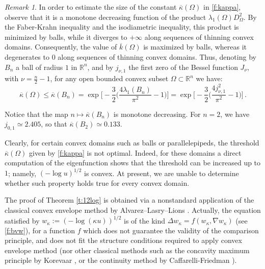 \documentclass[11pt]{amsart}
\theoremstyle{definition}
\theoremstyle{remark}
\newtheorem{remark}[theorem]{Remark}
\def\R{\mathbb{R}}
\def\Om{\Omega}
\def\k{\kappa}
\begin{document}
\smallskip 
 \begin{remark}\label{r:kappino} In order to estimate the size of  the constant $\overline \k (\Om)$ in \eqref{f:kappa},   observe that it is a monotone decreasing function of   the product $ \lambda _ 1 (\Om) D _\Om^2 $. 
 By the Faber-Krahn inequality and the isodiametric inequality,    this product is minimized by balls, 
while it diverges to $+ \infty$ along sequences of thinning convex domains.  Consequently, the value of $\overline k (\Om)$ is  maximized by balls, whereas it degenerates to $0$ along sequences of thinning convex domains. Thus, denoting by $B _n$ a ball of radius $1$  in  $\R^n$, and by  $j _{\nu, 1}$ the first zero of the Bessel function  $J _\nu$,  with $\nu = \frac{n}{2}- 1$,  for any 
open bounded convex subset   $\Om \subset \R ^n$   
 we have: 
\begin{equation}\label{f:kappamax}  \overline \k (\Om) \leq \overline \k ( B_n) =  \exp \Big [- \frac 3 2 \Big ( \frac{  4 \lambda _ 1 (B_n)   }{\pi ^ 2}  -1 \Big )  \Big ] =  \exp \Big [- \frac 3 2 \Big ( \frac{ 4j _{\nu, 1} ^ 2  }{\pi ^ 2}  -1 \Big )  \Big ]\,.
\end{equation}

Notice that the map  $n \mapsto \overline \k ( B_n)$ is monotone decreasing. For $n = 2$, 
we have $j _{0, 1}\simeq 2.405$, so that 
$\overline \k (B_2) \simeq 0.133$.  

Clearly,  for certain convex domains such as balls or parallelepipeds,  the threshold  $\overline \k (\Om)$  given by \eqref{f:kappa} is 
not optimal. Indeed, 
for these domains a direct  computation of the eigenfunction shows that the threshold can be increased up to $1$; namely, 
$( - \log u ) ^ {1/2}$ is convex. 
At present, we are unable to determine whether such property holds  true for every convex domain.  
 \end{remark} 

\smallskip 
The proof of Theorem \ref{t:12log} is obtained via a nonstandard application of  the
classical convex envelope method by Alvarez--Lasry--Lions \cite{ALL}.
Actually,   the equation 
satisfied by $w_\k:= (- \log (\k u ) ) ^ {1/2}$  is of the kind
$ \Delta w _\k = f (w _\k, \nabla w _\k)$  (see \eqref{f:bvw}), for a function $f$ which  does not guarantee the validity of 
the comparison principle, and does not fit the structure conditions required to apply convex envelope method (nor other classical methods such as the concavity maximum principle by Korevaar \cite{K83, CaSp}, 
or the continuity method by Caffarelli-Friedman \cite{CafFri}).
\end{document}
